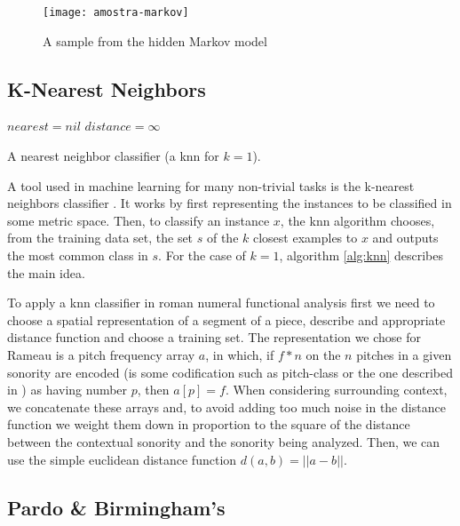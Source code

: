 \begin{figure*}[t]
  \centering
  \texttt{[image: amostra-markov]}
  \caption{A sample from the hidden Markov model}
  \label{fig:amostra}
\end{figure*}

\subsection{K-Nearest Neighbors}
\label{sec:knn}


\begin{algorithm}[t]
  \SetLine
  $nearest = nil$\;
  $distance = \infty$\;
  \;
  \caption{A nearest neighbor classifier (a knn for $k=1$).}
  \label{alg:knn}
\end{algorithm}

A tool used in machine learning for many non-trivial tasks is the
k-nearest neighbors classifier \cite{mitchell97:machine}. It works by
first representing the instances to be classified in some metric
space. Then, to classify an instance $x$, the knn algorithm chooses,
from the training data set, the set $s$ of the $k$ closest examples to
$x$ and outputs the most common class in $s$. For the case of $k=1$,
algorithm \ref{alg:knn} describes the main idea.

To apply a knn classifier in roman numeral functional analysis first
we need to choose a spatial representation of a segment of a piece,
describe\nota{,} and appropriate distance function and choose a training
set. The representation we chose for Rameau is a pitch frequency array
$a$, in which, if $f*n$ on the $n$ pitches in a given sonority are
encoded (is some codification such as pitch-class or the one described
in \cite{kroger08:rameau}) as having number $p$, then $a[p] = f$. When
considering surrounding context, we concatenate these arrays and, to
avoid adding too much noise in the distance function we weight them
down in proportion to the square of the distance between the
contextual sonority and the sonority being analyzed. Then, we can use
the simple euclidean distance function $d(a,b) = ||a-b||$.

\subsection{Pardo \& Birmingham's}
\label{sec:pardo--birminghams}

